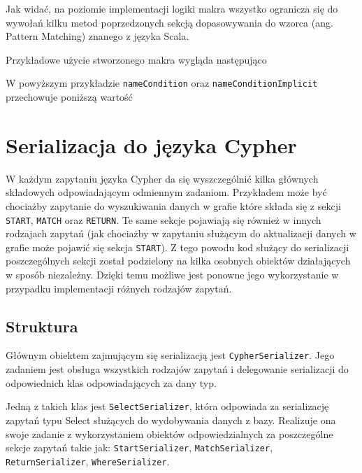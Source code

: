 \documentclass[brudnopis]{xmgr}
\begin{document}
Jak widać, na poziomie implementacji logiki makra wszystko ogranicza się do wywołań kilku metod poprzedzonych sekcją dopasowywania do wzorca (ang. Pattern Matching) znanego z języka Scala.

Przykładowe użycie stworzonego makra wygląda następująco



W powyższym przykładzie \texttt{nameCondition} oraz  \texttt{nameConditionImplicit} przechowuje poniższą wartość



\section{Serializacja do języka Cypher}

W każdym zapytaniu języka Cypher da się wyszczególnić kilka głównych składowych odpowiadającym odmiennym zadaniom. Przykładem może być chociażby zapytanie do wyszukiwania danych w grafie które składa się z sekcji \texttt{START}, \texttt{MATCH} oraz \texttt{RETURN}. Te same sekcje pojawiają się również w innych rodzajach zapytań (jak chociażby w zapytaniu służącym do aktualizacji danych w grafie może pojawić się sekcja \texttt{START}). Z tego powodu kod służący do serializacji poszczególnych sekcji  został podzielony na kilka osobnych obiektów działających w sposób niezależny. Dzięki temu możliwe jest ponowne jego wykorzystanie w przypadku implementacji różnych rodzajów zapytań.

\subsection{Struktura}

Głównym obiektem zajmującym się serializacją jest \texttt{CypherSerializer}. Jego zadaniem jest obsługa wszystkich rodzajów zapytań i delegowanie serializacji do odpowiednich klas odpowiadających za dany typ.

Jedną z takich klas jest \texttt{SelectSerializer}, która odpowiada za serializację zapytań typu Select służących do wydobywania danych z bazy. Realizuje ona swoje zadanie z wykorzystaniem obiektów odpowiedzialnych za poszczególne sekcje zapytań takie jak: \texttt{StartSerializer}, \texttt{MatchSerializer}, \texttt{ReturnSerializer}, \texttt{WhereSerializer}.
\end{document}
